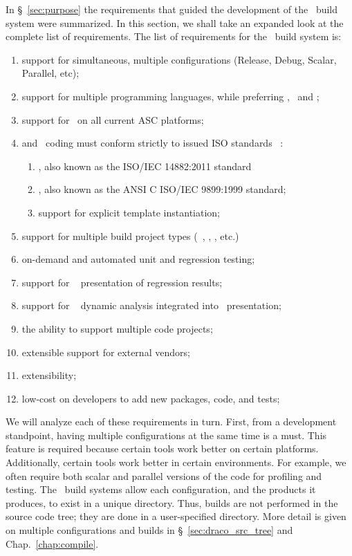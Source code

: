 In \S~\ref{sec:purpose} the requirements that guided the development
of the \draco\ build system were summarized.  In this section, we
shall take an expanded look at the complete list of requirements.  The
list of requirements for the \draco\ build system is:
%
\begin{enumerate}
\item support for simultaneous, multiple configurations (Release,
  Debug, Scalar, Parallel, etc);
\item support for multiple programming languages, while preferring
  , \cpp\ and ;
\item support for \cpp\ on all current ASC platforms;
\item {} and \cpp\ coding must conform strictly to issued ISO
  standards~\cite{ansi:cpp} :
\begin{enumerate}
\item {}, also known as the ISO/IEC 14882:2011 standard
\item {}, also known as the ANSI C ISO/IEC 9899:1999 standard;
\item support for explicit template instantiation; 
\end{enumerate}
\item support for multiple build project types (~\cite{gmake}, , , etc.)
\item on-demand and automated unit and regression testing; 
\item support for \cdash~\cite{cmake,codercdash} presentation of regression results;
\item support for \valgrind~\cite{valgrind} dynamic analysis integrated into \cdash\ presentation; 
\item the ability to support multiple code projects;
\item extensible support for external vendors; 
\item extensibility;
\item low-cost on developers to add new packages, code, and tests; 
\end{enumerate}
%
We will analyze each of these requirements in turn.  First, from a
development standpoint, having multiple configurations at the same
time is a must.  This feature is required because certain tools work
better on certain platforms.  Additionally, certain tools work better
in certain environments.  For example, we often require both scalar
and parallel versions of the code for profiling and testing.  The
\draco\ build systems allow each configuration, and the products it
produces, to exist in a unique directory.  Thus, builds are not
performed in the source code tree; they are done in a user-specified
directory.  More detail is given on multiple configurations and builds 
in \S~\ref{sec:draco_src_tree} and Chap.~\ref{chap:compile}.

